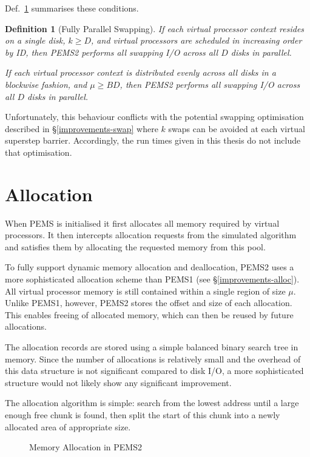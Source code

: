 \documentclass[12pt]{carletoncsthesis}
\newtheorem{definition}[thm]{Definition}
\begin{document}
Def.~\ref{full-swap-par} summarises these conditions.

\begin{definition}[Fully Parallel Swapping]
If each virtual processor context resides on a single disk, $k \ge D$,
and virtual processors are scheduled in increasing order by ID, then PEMS2
performs all swapping I/O across all $D$ disks in parallel.

If each virtual processor context is distributed evenly across all disks
in a blockwise fashion, and $\mu \ge BD$, then PEMS2 performs all swapping
I/O across all $D$ disks in parallel.
\label{full-swap-par}
\end{definition}

Unfortunately, this behaviour conflicts with the potential swapping
optimisation described in \S\ref{improvements-swap} where $k$ swaps can be
avoided at each virtual superstep barrier.  Accordingly, the run times given
in this thesis do not include that optimisation.

\section{Allocation}
\label{allocation-sec}


When PEMS is initialised it first allocates all memory required by virtual
processors.  It then intercepts allocation requests from the simulated algorithm
and satisfies them by allocating the requested memory from this pool.

To fully support dynamic memory allocation and deallocation, PEMS2 uses a more
sophisticated allocation scheme than PEMS1 (see \S\ref{improvements-alloc}).
All virtual processor memory is still contained within a single region of
size $\mu$.  Unlike PEMS1, however, PEMS2 stores the offset and size of
each allocation.  This enables freeing of allocated memory, which can then
be reused by future allocations.

The allocation records are stored using a simple balanced binary search tree
in memory.  Since the number of allocations is relatively small and the
overhead of this data structure is not significant compared to disk I/O, a
more sophisticated structure would not likely show any significant improvement.

The allocation algorithm is simple: search from the lowest address until a
large enough free chunk is found, then split the start of this chunk into
a newly allocated area of appropriate size.

\begin{figure}[h]
\begin{center}
\end{center}
\caption{Memory Allocation in PEMS2}
\label{pems2-allocation-fig}
\end{figure}
\end{document}
